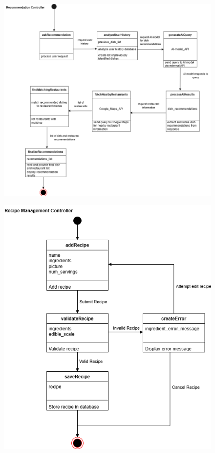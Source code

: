 \documentclass[]{article}
\begin{document}
\begin{figure}[H]
	\centering
   \includegraphics[width=\textwidth]{image/D3_state_diagrams/recommendation_system.png}
\end{figure}

\begin{figure}[H]
	\centering
   \includegraphics[width=\textwidth]{image/D3_state_diagrams/recipe_management.png}
\end{figure}
\end{document}
